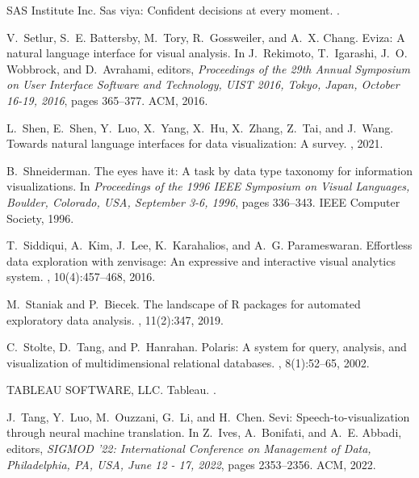 \documentclass[11pt]{article}
\begin{document}
\begin{thebibliography}{10}
\begin{small}
{SAS Institute Inc.}
\newblock Sas viya: Confident decisions at every moment.
.

V.~Setlur, S.~E. Battersby, M.~Tory, R.~Gossweiler, and A.~X. Chang.
\newblock Eviza: {A} natural language interface for visual analysis.
\newblock In J.~Rekimoto, T.~Igarashi, J.~O. Wobbrock, and D.~Avrahami,
  editors, {\em Proceedings of the 29th Annual Symposium on User Interface
  Software and Technology, {UIST} 2016, Tokyo, Japan, October 16-19, 2016},
  pages 365--377. {ACM}, 2016.

L.~Shen, E.~Shen, Y.~Luo, X.~Yang, X.~Hu, X.~Zhang, Z.~Tai, and J.~Wang.
\newblock Towards natural language interfaces for data visualization: A survey.
, 2021.

B.~Shneiderman.
\newblock The eyes have it: {A} task by data type taxonomy for information
  visualizations.
\newblock In {\em Proceedings of the 1996 {IEEE} Symposium on Visual Languages,
  Boulder, Colorado, USA, September 3-6, 1996}, pages 336--343. {IEEE} Computer
  Society, 1996.

T.~Siddiqui, A.~Kim, J.~Lee, K.~Karahalios, and A.~G. Parameswaran.
\newblock Effortless data exploration with zenvisage: An expressive and
  interactive visual analytics system.
, 10(4):457--468, 2016.

M.~Staniak and P.~Biecek.
\newblock The landscape of {R} packages for automated exploratory data
  analysis.
, 11(2):347, 2019.

C.~Stolte, D.~Tang, and P.~Hanrahan.
\newblock Polaris: {A} system for query, analysis, and visualization of
  multidimensional relational databases.
, 8(1):52--65, 2002.

{TABLEAU SOFTWARE, LLC}.
\newblock Tableau.
.

J.~Tang, Y.~Luo, M.~Ouzzani, G.~Li, and H.~Chen.
\newblock Sevi: Speech-to-visualization through neural machine translation.
\newblock In Z.~Ives, A.~Bonifati, and A.~E. Abbadi, editors, {\em {SIGMOD}
  '22: International Conference on Management of Data, Philadelphia, PA, USA,
  June 12 - 17, 2022}, pages 2353--2356. {ACM}, 2022.


\end{small}
\end{thebibliography}
\end{document}
